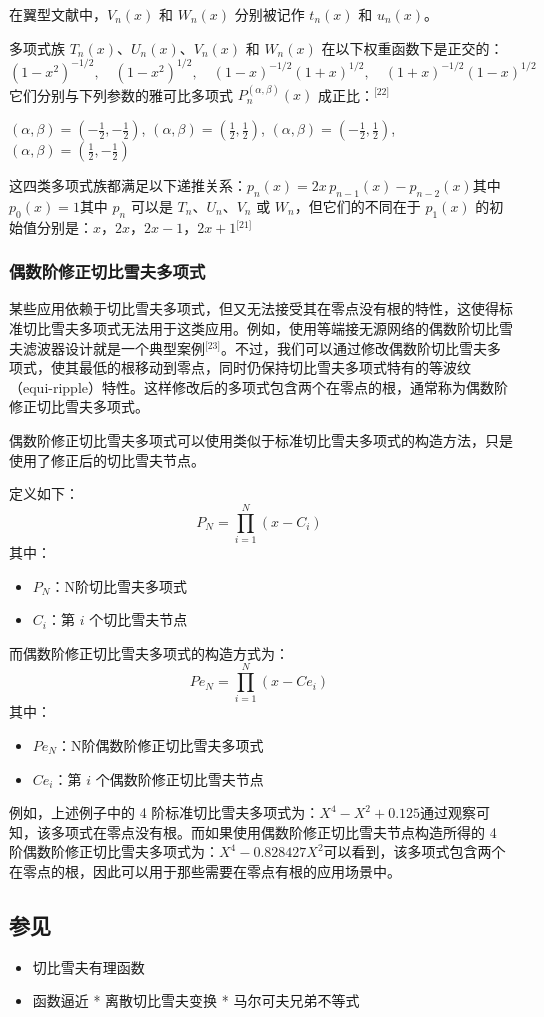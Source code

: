 在翼型文献中，$V_n(x)$ 和 $W_n(x)$ 分别被记作 $t_n(x)$ 和 $u_n(x)$。

多项式族 $T_n(x)$、$U_n(x)$、$V_n(x)$ 和 $W_n(x)$ 在以下权重函数下是正交的：
$$
(1 - x^2)^{-1/2}, \quad (1 - x^2)^{1/2}, \quad (1 - x)^{-1/2}(1 + x)^{1/2}, \quad (1 + x)^{-1/2}(1 - x)^{1/2}~
$$
它们分别与下列参数的雅可比多项式 $P_n^{(\alpha,\beta)}(x)$ 成正比：\(^\text{[22]}\)

$(\alpha, \beta) = \left(-\tfrac{1}{2}, -\tfrac{1}{2} \right)$,
$(\alpha, \beta) = \left( \tfrac{1}{2}, \tfrac{1}{2} \right)$,
$(\alpha, \beta) = \left( -\tfrac{1}{2}, \tfrac{1}{2} \right)$,
$(\alpha, \beta) = \left( \tfrac{1}{2}, -\tfrac{1}{2} \right)$

这四类多项式族都满足以下递推关系：$p_n(x) = 2x\,p_{n-1}(x) - p_{n-2}(x)$其中$p_0(x) = 1$其中 $p_n$ 可以是 $T_n$、$U_n$、$V_n$ 或 $W_n$，但它们的不同在于 $p_1(x)$ 的初始值分别是：$x$，$2x$，$2x - 1$，$2x + 1$\(^\text{[21]}\)
\subsubsection{偶数阶修正切比雪夫多项式}
某些应用依赖于切比雪夫多项式，但又无法接受其在零点没有根的特性，这使得标准切比雪夫多项式无法用于这类应用。例如，使用等端接无源网络的偶数阶切比雪夫滤波器设计就是一个典型案例\(^\text{[23]}\)。不过，我们可以通过修改偶数阶切比雪夫多项式，使其最低的根移动到零点，同时仍保持切比雪夫多项式特有的等波纹（equi-ripple）特性。这样修改后的多项式包含两个在零点的根，通常称为偶数阶修正切比雪夫多项式。

偶数阶修正切比雪夫多项式可以使用类似于标准切比雪夫多项式的构造方法，只是使用了修正后的切比雪夫节点。

定义如下：
$$
P_N = \prod_{i=1}^N (x - C_i)~
$$
其中：
\begin{itemize}
\item $P_N$：N阶切比雪夫多项式
\item $C_i$：第 $i$ 个切比雪夫节点
\end{itemize}

而偶数阶修正切比雪夫多项式的构造方式为：
$$
Pe_N = \prod_{i=1}^N (x - Ce_i)~
$$
其中：
\begin{itemize}
\item $Pe_N$：N阶偶数阶修正切比雪夫多项式
\item $Ce_i$：第 $i$ 个偶数阶修正切比雪夫节点
\end{itemize}
例如，上述例子中的 4 阶标准切比雪夫多项式为：$X^4 - X^2 + 0.125$通过观察可知，该多项式在零点没有根。而如果使用偶数阶修正切比雪夫节点构造所得的 4 阶偶数阶修正切比雪夫多项式为：$X^4 - 0.828427X^2$可以看到，该多项式包含两个在零点的根，因此可以用于那些需要在零点有根的应用场景中。
\subsection{参见}
\begin{itemize}
\item 切比雪夫有理函数
\item 函数逼近
* 离散切比雪夫变换
* 马尔可夫兄弟不等式
\end{itemize}
